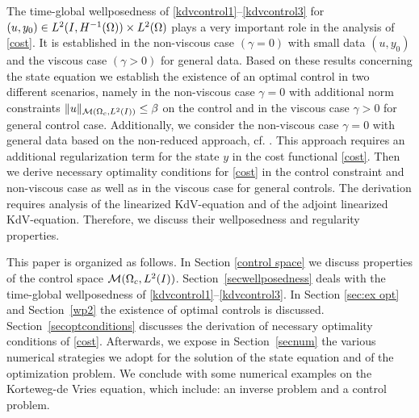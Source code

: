 The time-global wellposedness of \eqref{kdvcontrol1}--\eqref{kdvcontrol3} for $(u,y_0)\in \Hm1\times L^2(\Omega)$ plays a very important role in the analysis of \eqref{cost}. It is established in the non-viscous case $(\gamma=0)$ with small data $(u,y_0)$ and the viscous case $(\gamma>0)$ for general data. Based on these results concerning the state equation we establish the existence of an optimal control in two different scenarios, namely in the non-viscous case $\gamma=0$ with additional norm constraints $\|u\|_{\mathcal{M}(\Omega_c, L^{2}(I))}\leq \beta$ on the control and in the viscous case $\gamma>0$ for general control case. Additionally, we consider the non-viscous case $\gamma=0$ with general data based on the non-reduced approach, cf. \cite{lions1985control}. This approach requires an additional regularization term for the state $y$ in the cost functional \eqref{cost}. Then we derive necessary optimality conditions for \eqref{cost} in the control constraint and non-viscous case as well as in the viscous case for general controls. The derivation requires analysis of the linearized KdV-equation and of the adjoint linearized KdV-equation. Therefore, we discuss their wellposedness and regularity properties.          

This paper is organized as follows. In Section \ref{control space} we discuss properties of the control space $\mathcal{M}(\Omega_c, L^{2}(I))$. Section~\ref{secwellposedness} deals with the time-global wellposedness of \eqref{kdvcontrol1}--\eqref{kdvcontrol3}. In Section \ref{sec:ex opt} and Section~\ref{wp2} the existence of optimal controls is discussed. Section~\ref{secoptconditions} discusses the derivation of necessary optimality conditions of \eqref{cost}. Afterwards, we expose in Section~\ref{secnum} the various numerical strategies we adopt for the solution of the state equation and of the optimization problem. We conclude with some numerical examples on the Korteweg-de Vries equation, which include: an inverse problem and a control problem.

